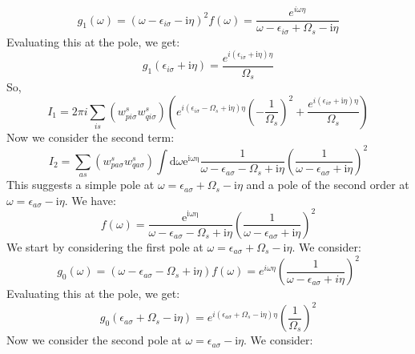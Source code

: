 \documentclass[12pt]{article}
\begin{document}
\begin{equation}
g_1(\omega) = \left( \omega - \epsilon_{i \sigma} - \mathrm{i} \eta \right)^2 f(\omega) = \frac{e^{i \omega \eta}}{\omega - \epsilon_{i \sigma} + \Omega_s - \mathrm{i} \eta}
\end{equation}
Evaluating this at the pole, we get:
\begin{equation}
g_1(\epsilon_{i \sigma} + \mathrm{i} \eta) = \frac{e^{i (\epsilon_{i \sigma} + \mathrm{i} \eta) \eta}}{\Omega_s}
\end{equation}
So,
\begin{equation}
I_1 = 2\pi i \sum_{is} \left( w_{p i \sigma}^s w_{q i \sigma}^s \right) \left( e^{i \left( \epsilon_{i \sigma} - \Omega_s + \mathrm{i} \eta \right) \eta} \left( -\frac{1}{\Omega_s} \right)^2 + \frac{e^{i \left( \epsilon_{i \sigma} + \mathrm{i} \eta \right) \eta}}{\Omega_s} \right)
\end{equation}
Now we consider the second term:
\begin{equation}
I_2 = \sum_{as} \left( w_{p a \sigma}^s w_{q a \sigma}^s \right) \int \mathrm{d} \omega \mathrm{e}^{\mathrm{i \omega \eta}} \frac{1}{\omega-\epsilon_{a \sigma}-\Omega_s+\mathrm{i} \eta} \left(\frac{1}{\omega-\epsilon_{a \sigma}+\mathrm{i} \eta} \right)^2
\end{equation}
This suggests a simple pole at $\omega = \epsilon_{a \sigma} + \Omega_s - \mathrm{i} \eta$ and a pole of the second order at $\omega = \epsilon_{a \sigma} - \mathrm{i} \eta$. We have:
\begin{equation}
f(\omega) = \frac{\mathrm{e}^{\mathrm{i \omega \eta }}}{\omega-\epsilon_{a \sigma}-\Omega_s+\mathrm{i} \eta} \left(\frac{1}{\omega-\epsilon_{a \sigma}+\mathrm{i} \eta} \right)^2
\end{equation}
We start by considering the first pole at $\omega = \epsilon_{a \sigma} + \Omega_s - \mathrm{i} \eta$. We consider:
\begin{equation}
g_0(\omega) = \left( \omega - \epsilon_{a \sigma} - \Omega_s + \mathrm{i} \eta \right) f(\omega) = e^{i \omega \eta} \left( \frac{1}{\omega - \epsilon_{a \sigma} + i \eta} \right)^2
\end{equation}
Evaluating this at the pole, we get:
\begin{equation}
g_0(\epsilon_{a \sigma} + \Omega_s - \mathrm{i} \eta) = e^{i (\epsilon_{a \sigma} + \Omega_s - \mathrm{i} \eta) \eta} \left( \frac{1}{\Omega_s} \right)^2
\end{equation}
Now we consider the second pole at $\omega = \epsilon_{a \sigma} - \mathrm{i} \eta$. We consider:
\end{document}
